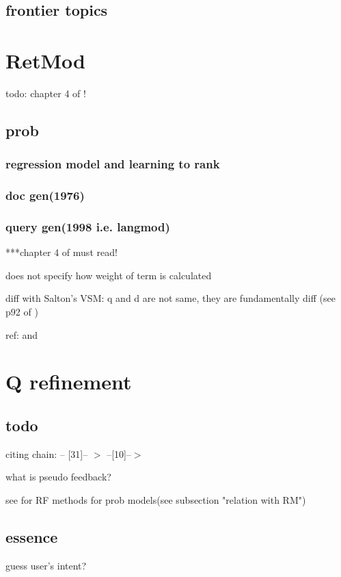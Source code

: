 \documentclass[•]{article}
\begin{document}
\subsection{frontier topics}


\section{RetMod}
todo: chapter 4 of \cite{Ponte1998}!

\subsection{prob}
\subsubsection{regression model and learning to rank}

\subsubsection{doc gen(1976)}

\subsubsection{query gen(1998 \cite{Ponte1998} \cite{Ponte1998a} i.e. langmod)}
***chapter 4 of \cite{Ponte1998} must read!

does not specify how weight of term is calculated

diff with Salton's VSM: q and d are not same, they are fundamentally diff (see p92 of \cite{Ponte1998a})

ref: \cite{Ponte1998} and \cite{Ponte1998a}

\section{Q refinement}

\subsection{todo}
citing chain: \cite{Lv2011} -- [31]-- $>$ \cite{Zhai2001} --[10]--$>$ \cite{Ponte1998}

what is pseudo feedback?

see \cite{Lv2011} for RF methods for prob models(see subsection "relation with RM")

\subsection{essence}
guess user's intent? 
\end{document}
